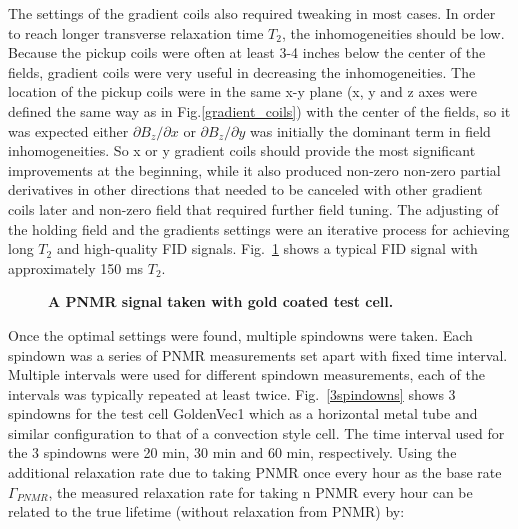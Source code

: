 The settings of the gradient coils also required tweaking in most cases. In order to reach longer transverse relaxation time $T_2$, the inhomogeneities should be low. Because the pickup coils were often at least 3-4 inches below the center of the fields, gradient coils were very useful in decreasing the inhomogeneities. The location of the pickup coils were in the same x-y plane (x, y and z axes were defined the same way as in Fig.\ref{gradient_coils}) with the center of the fields, so it was expected either $\partial B_z/\partial x$ or $\partial B_z/\partial y$ was initially the dominant term in field inhomogeneities. So x or y gradient coils should provide the most significant improvements at the beginning, while it also produced non-zero non-zero partial derivatives in other directions that needed to be canceled with other gradient coils later and non-zero field that required further field tuning. The adjusting of the holding field and the gradients settings were an iterative process for achieving long $T_2$ and high-quality FID signals. Fig.~\ref{FID} shows a typical FID signal with approximately 150 ms $T_2$.

\begin{figure}[H]
	\centering
	\caption{{\bf A PNMR signal taken with gold coated test cell.}}
	\label{FID}
\end{figure}

Once the optimal settings were found, multiple spindowns were taken. Each spindown was a series of PNMR measurements set apart with fixed time interval. Multiple intervals were used for different spindown measurements, each of the intervals was typically repeated at least twice. Fig.~\ref{3spindowns} shows 3 spindowns for the test cell GoldenVec1 which as a horizontal metal tube and similar configuration to that of a convection style cell. The time interval used for the 3 spindowns were 20 min, 30 min and 60 min, respectively. Using the additional relaxation rate due to taking PNMR once every hour as the base rate $\Gamma_{PNMR}$, the measured relaxation rate for taking n PNMR every hour can be related to the true lifetime (without relaxation from PNMR) by:

